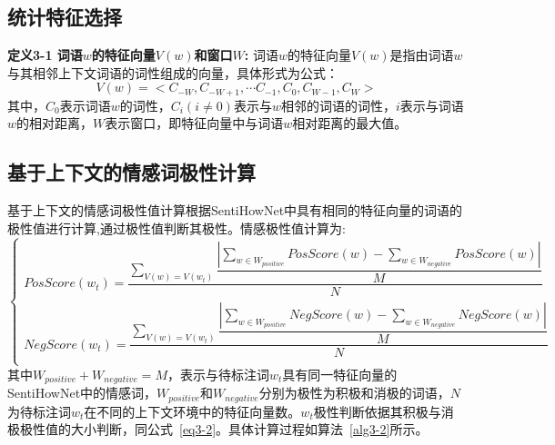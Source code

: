 \subsection{统计特征选择}
\textbf{定义3-1 词语$w$的特征向量$V(w)$和窗口$W$:} 词语$w$的特征向量$V(w)$是指由词语$w$与其相邻上下文词语的词性组成的向量，具体形式为公式：
$$V(w)=<C_{-W},C_{-W+1},\cdots C_{-1},C_0,C_{W-1},C_W>$$
其中，$C_0$表示词语$w$的词性，$C_i(i\neq 0)$表示与$w$相邻的词语的词性，$i$表示与词语$w$的相对距离，$W$表示窗口，即特征向量中与词语$w$相对距离的最大值。

\subsection{基于上下文的情感词极性计算}
基于上下文的情感词极性值计算根据SentiHowNet中具有相同的特征向量的词语的极性值进行计算,通过极性值判断其极性。情感极性值计算为:
\begin{equation}
\begin{cases}
PosScore(w_t)=\dfrac{\sum_{V(w)=V(w_t)}\dfrac{|\sum_{w \in W_{positive}}PosScore(w)-\sum_{w \in W_{negative}}PosScore(w)|}{M}}{N} \\
NegScore(w_t)=\dfrac{\sum_{V(w)=V(w_t)}\dfrac{|\sum_{w \in W_{positive}}NegScore(w)-\sum_{w \in W_{negative}}NegScore(w)|}{M}}{N} \\
\end{cases}
\end{equation}
其中$W_{positive}+W_{negative}=M$，表示与待标注词$w_t$具有同一特征向量的SentiHowNet中的情感词，$W_{positive}$和$W_{negative}$分别为极性为积极和消极的词语，$N$为待标注词$w_t$在不同的上下文环境中的特征向量数。$w_t$极性判断依据其积极与消极极性值的大小判断，同公式~\ref{eq3-2}。具体计算过程如算法~\ref{alg3-2}所示。

